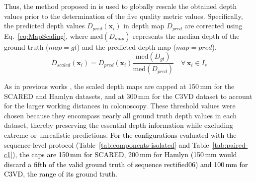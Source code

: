 \documentclass[a4paper,fleqn]{cas-dc}
\begin{document}
{Thus, the method proposed in \citep{Godard_ICCV_2019} is used to globally rescale the obtained depth values prior to the determination of the five quality metric values. Specifically, the predicted depth values \( D_{pred}(\mathbf{x}_i) \) in depth map \( D_{pred} \) are corrected using Eq.~\eqref{eq:MapScaling}, where \( \textrm{med}(D_{map}) \) represents the median depth of the ground truth (\( map = gt \)) and the predicted depth map (\( map = pred \)).
%
\begin{equation} \label{eq:MapScaling}
    D_{scaled}(\mathbf{x}_i) = D_{pred}(\mathbf{x}_i) \frac{\textrm{med}(D_{gt})} {\textrm{med}(D_{pred})} \quad \forall \, \mathbf{x}_i \in I_s
\end{equation}
%

As in previous works \citep{Godard_ICCV_2019,Ozyoruk_MIA_2021,Shao_MIA_2022}, the scaled depth maps are capped at 150\,mm for the SCARED and Hamlyn datasets, and at 300\,mm for the C3VD dataset to account for the larger working distances in colonoscopy. These threshold values were chosen because they encompass nearly all ground truth depth values in each dataset, thereby preserving the essential depth information while excluding extreme or unrealistic predictions.
\textcolor{black}{For the configurations evaluated with the sequence-level protocol (Table~\ref{tab:components-isolated} and Table~\ref{tab:paired-c1}), the caps are 150\,mm for SCARED, 200\,mm for Hamlyn (150\,mm would discard a fifth of the valid ground truth of sequence rectified06) and 100\,mm for C3VD, the range of its ground truth.}

}
\end{document}
